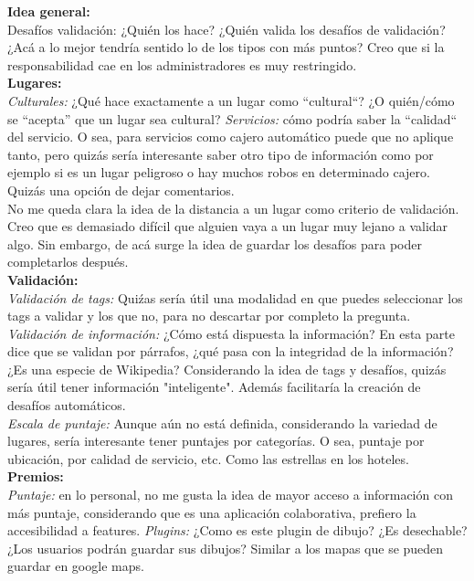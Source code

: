 \documentclass[10pt,letterpaper]{article}
\begin{document}
\textbf{Idea general:}\\

Desafíos validación: ¿Quién los hace? ¿Quién valida los desafíos de validación? ¿Acá a lo mejor tendría sentido lo de los tipos con más puntos? Creo que si la responsabilidad cae en los administradores es muy restringido.\\

\textbf{Lugares:}\\

\textsl{Culturales:} ¿Qué hace exactamente a un lugar como ``cultural``? ¿O quién/cómo se ``acepta'' que un lugar sea cultural?
\textsl{Servicios:} cómo podría saber la ``calidad`` del servicio. O sea, para servicios como cajero automático puede que no aplique tanto, pero quizás sería interesante saber otro tipo de información como por ejemplo si es un lugar peligroso o hay muchos robos en determinado cajero. Quizás una opción de dejar comentarios.\\

No me queda clara la idea de la distancia a un lugar como criterio de validación. Creo que es demasiado difícil que alguien vaya a un lugar muy lejano a validar algo. Sin embargo, de acá surge la idea de guardar los desafíos para poder completarlos después.\\

\textbf{Validación:}\\

\textsl{Validación de tags:} Quiźas sería útil una modalidad en que puedes seleccionar los tags a validar y los que no, para no descartar por completo la pregunta.\\

\textsl{Validación de información:} ¿Cómo está dispuesta la información? En esta parte dice que se validan por párrafos, ¿qué pasa con la integridad de la información? ¿Es una especie de Wikipedia? Considerando la idea de tags y desafíos, quizás sería útil tener información "inteligente". Además facilitaría la creación de desafíos automáticos.\\

\textsl{Escala de puntaje:} Aunque aún no está definida, considerando la variedad de lugares, sería interesante tener puntajes por categorías. O sea, puntaje por ubicación, por calidad de servicio, etc. Como las estrellas en los hoteles.\\

\textbf{Premios:}\\

\textsl{Puntaje:} en lo personal, no me gusta la idea de mayor acceso a información con más puntaje, considerando que es una aplicación colaborativa, prefiero la accesibilidad a features.
\textsl{Plugins:} ¿Como es este plugin de dibujo? ¿Es desechable? ¿Los usuarios podrán guardar sus dibujos? Similar a los mapas que se pueden guardar en google maps.
\end{document}
